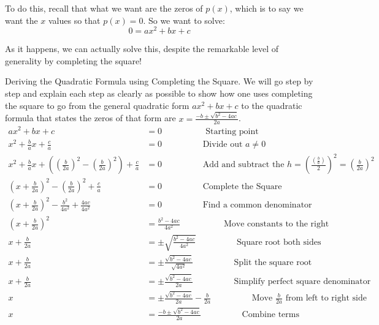 \documentclass{ximera}
\begin{document}
    To do this, recall that what we want are the zeros of $p(x)$, which is to say we want the $x$ values so that $p(x) = 0$. So we want to solve:
    \[
        0 = ax^2 + bx + c
    \]
    
    As it happens, we can actually solve this, despite the remarkable level of generality by completing the square! 
    
    \begin{example}%
        Deriving the Quadratic Formula using Completing the Square. We will go step by step and explain each step as clearly as possible to show how one uses completing the square to go from the general quadratic form $ax^2 + bx + c$ to the quadratic formula that states the zeros of that form are $x = \frac{-b \pm \sqrt{b^2-4ac}}{2a}$.
        \begin{align*}
            ax^2 + bx + c & = 0  \hspace{2cm} \text{ Starting point}    \\
            x^2 + \frac{b}{a}x + \frac{c}{a} & = 0    \hspace{2cm} \text{Divide out }a \neq 0  \\
            x^2 + \frac{b}{a}x + \left(\left(\frac{b}{2a}\right)^2 - \left(\frac{b}{2a}\right)^2\right) + \frac{c}{a} & = 0  \hspace{2cm} \text{Add and subtract the $h = \left(\frac{\left(\frac{b}{a}\right)}{2}\right)^2 = \left(\frac{b}{2a}\right)^2$ }    \\
            \left(x + \frac{b}{2a}\right)^2 - \left(\frac{b}{2a}\right)^2 + \frac{c}{a} & = 0    \hspace{2cm} \text{Complete the Square} \\
            \left( x + \frac{b}{2a}\right)^2 - \frac{b^2}{4a^2} + \frac{4ac}{4a^2} & = 0  \hspace{2cm} \text{Find a common denominator}\\
            \left(x + \frac{b}{2a}\right)^2 & = \frac{b^2-4ac}{4a^2} \hspace{2cm} \text{ Move constants to the right} \\
            x + \frac{b}{2a} & = \pm \sqrt{\frac{b^2-4ac}{4a^2}} \hspace{2cm} \text{Square root both sides} \\
            x + \frac{b}{2a} & = \pm \frac{\sqrt{b^2-4ac}}{\sqrt{4a^2}} \hspace{2cm} \text{Split the square root} \\
            x + \frac{b}{2a} & = \pm \frac{\sqrt{b^2-4ac}}{2a} \hspace{2cm} \text{Simplify perfect square denominator} \\
            x &= \pm \frac{\sqrt{b^2-4ac}}{2a} -\frac{b}{2a} \hspace{2cm} \text{Move $\frac{b}{2a}$ from left to right side} \\
            x &= \frac{-b \pm \sqrt{b^2-4ac}}{2a} \hspace{2cm} \text{Combine terms} \\
        \end{align*}
    \end{example}%
    
\end{document}
